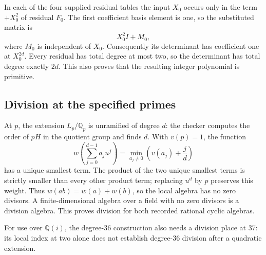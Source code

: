 In each of the four supplied residual tables the input $X_0$ occurs
only in the term $+X_0^2$ of residual $F_0$.  The first coefficient
basis element is one, so the substituted matrix is
\[
                           X_0^2 I+M_0,
\]
where $M_0$ is independent of $X_0$.  Consequently its determinant
has coefficient one at $X_0^{2d}$.  Every residual has total degree
at most two, so the determinant has total degree exactly $2d$.
This also proves that the resulting integer polynomial is primitive.

\subsection{Division at the specified primes}

At $p$, the extension $L_p/\mathbb Q_p$ is unramified of degree
$d$: the checker computes the order of $pH$ in the quotient group
and finds $d$.  With $v(p)=1$, the function
\[
 w\left(\sum_{j=0}^{d-1}a_ju^j\right)
       =\min_{a_j\ne0}\left(v(a_j)+\frac jd\right)
\]
has a unique smallest term.  The product of the two unique smallest
terms is strictly smaller than every other product term; replacing
$u^d$ by $p$ preserves this weight.  Thus $w(ab)=w(a)+w(b)$,
so the local algebra has no zero divisors.  A finite-dimensional
algebra over a field with no zero divisors is a division algebra.
This proves division for both recorded rational cyclic algebras.

For use over $\mathbb Q(i)$, the degree-36 construction also needs
a division place at 37: its local index at two alone does not
establish degree-36 division after a quadratic extension.

